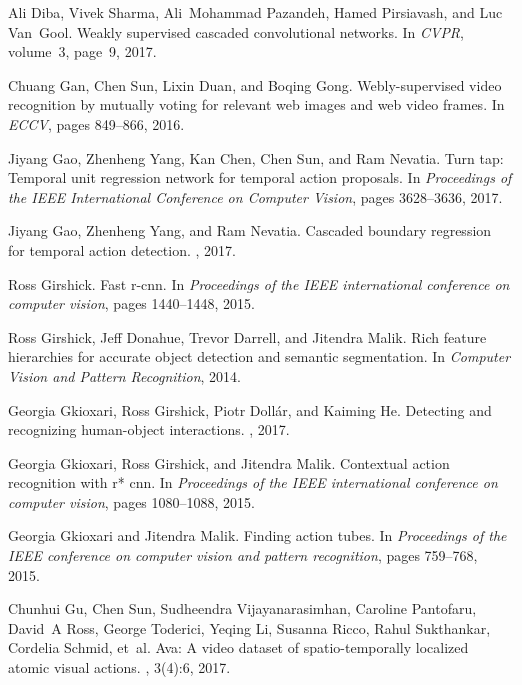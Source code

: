 \documentclass[10pt,twocolumn,letterpaper]{article}
\begin{document}
{\begin{thebibliography}{10}
Ali Diba, Vivek Sharma, Ali~Mohammad Pazandeh, Hamed Pirsiavash, and Luc
  Van~Gool.
\newblock Weakly supervised cascaded convolutional networks.
\newblock In {\em CVPR}, volume~3, page~9, 2017.

Chuang Gan, Chen Sun, Lixin Duan, and Boqing Gong.
\newblock Webly-supervised video recognition by mutually voting for relevant
  web images and web video frames.
\newblock In {\em ECCV}, pages 849--866, 2016.

Jiyang Gao, Zhenheng Yang, Kan Chen, Chen Sun, and Ram Nevatia.
\newblock Turn tap: Temporal unit regression network for temporal action
  proposals.
\newblock In {\em Proceedings of the IEEE International Conference on Computer
  Vision}, pages 3628--3636, 2017.

Jiyang Gao, Zhenheng Yang, and Ram Nevatia.
\newblock Cascaded boundary regression for temporal action detection.
, 2017.

Ross Girshick.
\newblock Fast r-cnn.
\newblock In {\em Proceedings of the IEEE international conference on computer
  vision}, pages 1440--1448, 2015.

Ross Girshick, Jeff Donahue, Trevor Darrell, and Jitendra Malik.
\newblock Rich feature hierarchies for accurate object detection and semantic
  segmentation.
\newblock In {\em Computer Vision and Pattern Recognition}, 2014.

Georgia Gkioxari, Ross Girshick, Piotr Doll{\'a}r, and Kaiming He.
\newblock Detecting and recognizing human-object interactions.
, 2017.

Georgia Gkioxari, Ross Girshick, and Jitendra Malik.
\newblock Contextual action recognition with r* cnn.
\newblock In {\em Proceedings of the IEEE international conference on computer
  vision}, pages 1080--1088, 2015.

Georgia Gkioxari and Jitendra Malik.
\newblock Finding action tubes.
\newblock In {\em Proceedings of the IEEE conference on computer vision and
  pattern recognition}, pages 759--768, 2015.

Chunhui Gu, Chen Sun, Sudheendra Vijayanarasimhan, Caroline Pantofaru, David~A
  Ross, George Toderici, Yeqing Li, Susanna Ricco, Rahul Sukthankar, Cordelia
  Schmid, et~al.
\newblock Ava: A video dataset of spatio-temporally localized atomic visual
  actions.
, 3(4):6, 2017.


\end{thebibliography}}
\end{document}
